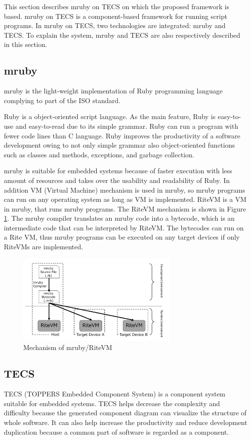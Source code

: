 \documentclass[conference,compsoc]{IEEEtran}
\begin{document}
This section describes mruby on TECS on which the proposed framework is based.
mruby on TECS is a component-based framework for running script programs.
In mruby on TECS, two technologies are integrated: mruby and TECS.
To explain the system, mruby and TECS are also respectively described in this section.

\subsection{mruby}
\label{sec:mruby}
mruby is the light-weight implementation of Ruby programming language complying to part of the ISO standard.

Ruby is a object-oriented script language.
As the main feature, Ruby is easy-to-use and easy-to-read due to its simple grammar.
Ruby can run a program with fewer code lines than C language.
Ruby improves the productivity of a software development owing to not only simple grammar also object-oriented functions such as classes and methods, exceptions, and garbage collection.

mruby is suitable for embedded systems because of faster execution with less amount of resources and takes over the usability and readability of Ruby.
In addition VM (Virtual Machine) mechanism is used in mruby, so mruby programs can run on any operating system as long as VM is implemented.
RiteVM is a VM in mruby, that runs mruby programs.
The RiteVM mechanism is shown in Figure \ref{fig:mruby}.
The mruby compiler translates an mruby code into a bytecode, which is an intermediate code that can be interpreted by RiteVM.
The bytecodes can run on a Rite VM, thus mruby programs can be executed on any target devices if only RiteVMs are implemented.
\begin{figure}[t]
    \centering
    \includegraphics[width=8cm,clip]{figure/mruby.pdf}
    \caption{Mechanism of mruby/RiteVM}
    \label{fig:mruby}
\end{figure}

\subsection{TECS}
\label{sec:TECS}
TECS (TOPPERS Embedded Component System) is a component system suitable for embedded systems.
TECS helps decrease the complexity and difficulty because the generated component diagram can visualize the structure of whole software.
It can also help increase the productivity and reduce development duplication  because a common part of software is regarded as a component.
\end{document}
